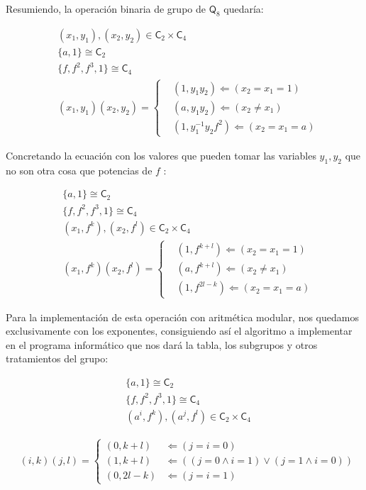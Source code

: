 \documentclass[12pt,a4paper,fleqn,spanish,final,openright]{extbook}
\theoremstyle{definition}
\theoremstyle{remark}
\begin{document}
	Resumiendo, la operación binaria de grupo de $\mathsf{Q}_{8}$ quedaría:

\begin{align*}
&(x_1,y_1),(x_2,y_2)\in \mathsf{C}_{2}\times\mathsf{C}_{4}\\
&\{a,1\}\cong\mathsf{C}_{2}\\
&\{f,f^2,f^3,1\}\cong\mathsf{C}_{4}\\
&(x_1,y_1) (x_2,y_2)=
\begin{cases}
&(1,y_1 y_2 ) \Leftarrow \left(x_2 = x_1 = 1\right)\\
&(a,y_1 y_2 ) \Leftarrow \left(x_2\neq x_1\right)\\
&(1,y_1^{-1} y_2 f^2) \Leftarrow \left(x_2 = x_1 = a\right)
\end{cases}
\end{align*}

	Concretando la ecuación con los valores que pueden tomar las variables $y_1 , y_2$ que no son otra cosa que potencias de $f$ :
	
\begin{align*}
&\{a,1\}\cong\mathsf{C}_{2}\\
&\{f,f^2,f^3,1\}\cong\mathsf{C}_{4}\\
&(x_1,f^k),(x_2,f^l)\in \mathsf{C}_{2}\times\mathsf{C}_{4}\\
&(x_1,f^k) (x_2,f^l)=
\begin{cases}
&(1,f^{k+l}) \Leftarrow \left(x_2 = x_1 = 1\right)\\
&(a,f^{k+l}) \Leftarrow \left(x_2 \neq x_1 \right)\\
&(1,f^{2l-k}) \Leftarrow \left(x_2 = x_1 = a\right)
\end{cases}
\end{align*}
     
	Para la implementación de esta operación con aritmética modular, nos quedamos exclusivamente con los exponentes, consiguiendo así el algoritmo a implementar en el programa informático que nos dará la tabla, los subgrupos y otros tratamientos del grupo:
	
\begin{align*}
&\{a,1\}\cong\mathsf{C}_{2}\\
&\{f,f^2,f^3,1\}\cong\mathsf{C}_{4}\\
&(a^i,f^k),(a^j,f^l)\in \mathsf{C}_{2}\times\mathsf{C}_{4}
\end{align*}


\begin{align*}
&(i,k)(j,l)=
\begin{cases}
(0,k+l) &\Leftarrow {\left(j = i = 0\right)}\\
(1,k+l) &\Leftarrow {\left( (j = 0 \wedge i=1)\vee(j=1 \wedge i=0) \right)}\\
(0,2l-k) &\Leftarrow {\left(j = i = 1\right)}
\end{cases}
\end{align*}
\end{document}
